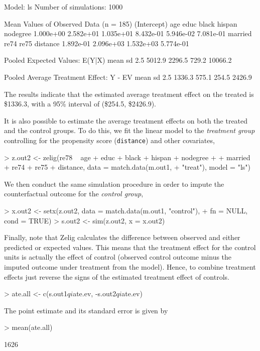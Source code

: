 \begin{enumerate}
\begin{Schunk}
\begin{Soutput}
  Model: ls 
  Number of simulations: 1000 

Mean Values of Observed Data (n = 185) 
(Intercept)         age        educ       black      hispan    nodegree 
  1.000e+00   2.582e+01   1.035e+01   8.432e-01   5.946e-02   7.081e-01 
    married        re74        re75    distance 
  1.892e-01   2.096e+03   1.532e+03   5.774e-01 

Pooled Expected Values: E(Y|X)
   mean      sd    2.5%   97.5% 
 5012.9  2296.5   729.2 10066.2 

Pooled Average Treatment Effect: Y - EV
  mean     sd   2.5%  97.5% 
1336.3  575.1  254.5 2426.9 

\end{Soutput}
\end{Schunk}
The results indicate that the estimated average treatment effect on
the treated is 
\$1336.3,
with a 95\% interval of
(\$254.5,
\$2426.9).

It is also possible to estimate the average treatment effects on both
the treated and the control groups. To do this, we fit the linear
model to the {\it treatment group} controlling for the propensity
score ({\tt distance}) and other covariates,
\begin{Schunk}
\begin{Sinput}
> z.out2 <- zelig(re78 ~ age + educ + black + hispan + nodegree + 
+     married + re74 + re75 + distance, data = match.data(m.out1, 
+     "treat"), model = "ls")
\end{Sinput}
\end{Schunk}
We then conduct the same simulation procedure in order to impute the
counterfactual outcome for the {\it control group},
\begin{Schunk}
\begin{Sinput}
> x.out2 <- setx(z.out2, data = match.data(m.out1, "control"), 
+     fn = NULL, cond = TRUE)
> s.out2 <- sim(z.out2, x = x.out2)
\end{Sinput}
\end{Schunk}
Finally, note that Zelig calculates the difference between observed
and either predicted or expected values.  This means that the
treatment effect for the control units is actually the effect of
control (observed control outcome minus the imputed outcome under
treatment from the model).  Hence, to combine treatment effects just
reverse the signs of the estimated treatment effect of controls.
\begin{Schunk}
\begin{Sinput}
> ate.all <- c(s.out1$qi$ate.ev, -s.out2$qi$ate.ev)
\end{Sinput}
\end{Schunk}
The point estimate and its standard error is given by
\begin{Schunk}
\begin{Sinput}
> mean(ate.all)
\end{Sinput}
\begin{Soutput}
[1] 1626


\end{Soutput}
\end{Schunk}
\end{enumerate}
